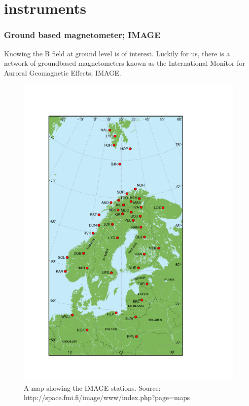 \documentclass[norsk,a4paper,12pt]{article}
\begin{document}



\section{instruments} %
\label{sec:instruments}

\subsubsection{Ground based magnetometer; IMAGE}
Knowing the B field at ground level is of interest. Luckily for us, there is a network of groundbased magnetometers known as the International Monitor for Auroral Geomagnetic Effects; IMAGE.\\
\begin{figure}[H]
\includegraphics[scale = 0.5]{Figures/magnetometer_map.pdf}
\centering
\caption{A map showing the IMAGE stations. Source: http://space.fmi.fi/image/www/index.php?page=maps}
\label{fig::image_map}
\end{figure}
\end{document}
